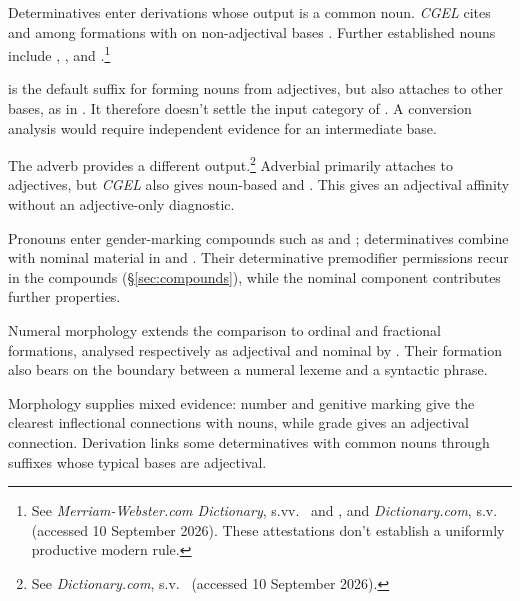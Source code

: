 \documentclass[12pt]{article}
\begin{document}
Determinatives enter derivations whose output is a common noun. \textit{CGEL} cites  and  among formations with  on non-adjectival bases \citep[Ch.~19, §5.7.2(i)]{huddleston2002}. Further established nouns include , , and .\footnote{See \textit{Merriam-Webster.com Dictionary}, s.vv.\ \href{https://www.merriam-webster.com/dictionary/thisness}{} and \href{https://www.merriam-webster.com/dictionary/fewness}{}, and \textit{Dictionary.com}, s.v.\ \href{https://www.dictionary.com/browse/muchness}{} (accessed 10 September 2026). These attestations don't establish a uniformly productive modern rule.}

 is the default suffix for forming nouns from adjectives, but also attaches to other bases, as in  \citep[Ch.~19, §5.7.2(i)]{huddleston2002}. It therefore doesn't settle the input category of . A conversion analysis would require independent evidence for an intermediate base.

The adverb  provides a different output.\footnote{See \textit{Dictionary.com}, s.v.\ \href{https://www.dictionary.com/browse/mostly}{} (accessed 10 September 2026).} Adverbial  primarily attaches to adjectives, but \textit{CGEL} also gives noun-based  and  \citep[566]{huddleston2002}. This gives  an adjectival affinity without an adjective-only diagnostic.

Pronouns enter gender-marking compounds such as  and  \citep[Ch.~19, §5.3]{huddleston2002}; determinatives combine with nominal material in  and . Their determinative premodifier permissions recur in the compounds (§\ref{sec:compounds}), while the nominal component contributes further properties.

Numeral morphology extends the comparison to ordinal and fractional formations, analysed respectively as adjectival and nominal by \textcite{reynolds2026numerals}. Their formation also bears on the boundary between a numeral lexeme and a syntactic phrase.

Morphology supplies mixed evidence: number and genitive marking give the clearest inflectional connections with nouns, while grade gives an adjectival connection. Derivation links some determinatives with common nouns through suffixes whose typical bases are adjectival.
\end{document}

